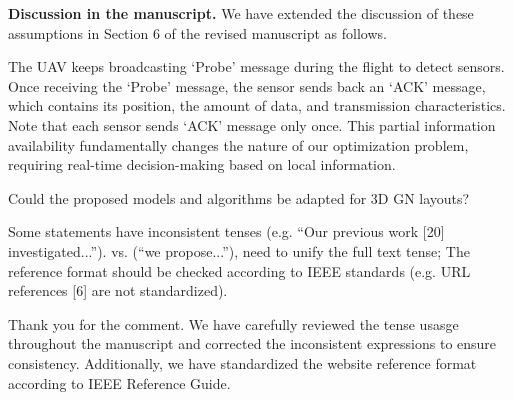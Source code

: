 \begin{revresponse}
	\textbf{Discussion in the manuscript.}
	We have extended the discussion of these assumptions in Section 6 of the revised manuscript as follows.
	\begin{changes}
		The UAV keeps broadcasting `Probe' message during the flight to detect sensors. Once receiving the `Probe' message, the sensor sends back an `ACK' message, which contains its position, the amount of data, and transmission characteristics. Note that each sensor sends `ACK' message only once. This partial information availability fundamentally changes the nature of our optimization problem, requiring real-time 
		decision-making based on local information.
	\end{changes}
\end{revresponse}

\begin{revcomment}
	Could the proposed models and algorithms be adapted for 3D GN layouts?
\end{revcomment}
\begin{revresponse}
	
\end{revresponse}

\begin{revcomment}
	Some statements have inconsistent tenses (e.g. ``Our previous work [20] investigated...''). vs. (``we propose...''), need to unify the full text tense; The reference format should be checked according to IEEE standards (e.g. URL references [6] are not standardized).
\end{revcomment}
\begin{revresponse}
	Thank you for the comment.
	We have carefully reviewed the tense usasge throughout the manuscript and corrected the inconsistent expressions to ensure consistency. Additionally, we have standardized the website reference format according to IEEE Reference Guide.
\end{revresponse}

